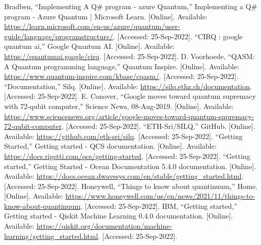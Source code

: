 \documentclass[conference]{IEEEtran}
\begin{document}
\begin{thebibliography}{00}

 Bradben, “Implementing A Q\# program - azure Quantum,” Implementing a Q\# program - Azure Quantum | Microsoft Learn. [Online]. Available: \href{https://learn.microsoft.com/en-us/azure/quantum/user-guide/language/programstructure/}{https://learn.microsoft.com/en-us/azure/quantum/user-guide/language/programstructure/}. [Accessed: 25-Sep-2022]. 
 “CIRQ : google quantum ai,” Google Quantum AI. [Online]. Available: \href{https://quantumai.google/cirq}{https://quantumai.google/cirq}. [Accessed: 25-Sep-2022]. 
 D. Voorhoede, “QASM: A Quantum programming language,” Quantum Inspire. [Online]. Available: \href{https://www.quantum-inspire.com/kbase/cqasm/}{https://www.quantum-inspire.com/kbase/cqasm/}. [Accessed: 25-Sep-2022]. 
 “Documentation,” Silq. [Online]. Available: \href{https://silq.ethz.ch/documentation}{https://silq.ethz.ch/documentation}. [Accessed: 25-Sep-2022]. 
 E. Conover, “Google moves toward quantum supremacy with 72-qubit computer,” Science News, 08-Aug-2019. [Online]. Available: \href{https://www.sciencenews.org/article/google-moves-toward-quantum-supremacy-72-qubit-computer}{https://www.sciencenews.org/article/google-moves-toward-quantum-supremacy-72-qubit-computer}. [Accessed: 25-Sep-2022]. 
 “ETH-Sri/SILQ,” GitHub. [Online]. Available: \href{https://github.com/eth-sri/silq}{https://github.com/eth-sri/silq}. [Accessed: 25-Sep-2022]. 
 “Getting Started,” Getting started - QCS documentation. [Online]. Available: \href{https://docs.rigetti.com/qcs/getting-started}{https://docs.rigetti.com/qcs/getting-started}. [Accessed: 25-Sep-2022]. 
 “Getting started,” Getting Started - Ocean Documentation 5.4.0 documentation. [Online]. Available: \href{https://docs.ocean.dwavesys.com/en/stable/getting_started.html}{https://docs.ocean.dwavesys.com/en/stable/getting\_started.html}. [Accessed: 25-Sep-2022]. 
 Honeywell, “Things to know about quantinuum,” Home. [Online]. Available: \href{https://www.honeywell.com/us/en/news/2021/11/things-to-know-about-quantinuum}{https://www.honeywell.com/us/en/news/2021/11/things-to-know-about-quantinuum}. [Accessed: 25-Sep-2022]. 
 IBM, “Getting started,” Getting started - Qiskit Machine Learning 0.4.0 documentation. [Online]. Available: \href{https://qiskit.org/documentation/machine-learning/getting_started.html}{https://qiskit.org/documentation/machine-learning/getting\_started.html}. [Accessed: 25-Sep-2022]. 

\end{thebibliography}
\end{document}
